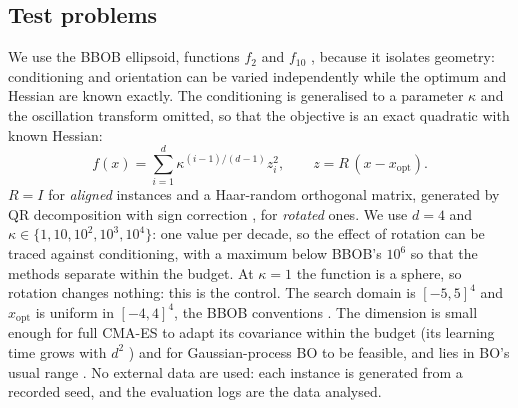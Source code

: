 \documentclass[12pt]{article}
\begin{document}
\subsection{Test problems}
We use the BBOB ellipsoid, functions $f_2$ and $f_{10}$ \parencite{hansen2009functions}, because it isolates geometry: conditioning and orientation can be varied independently while the optimum and Hessian are known exactly. The conditioning is generalised to a parameter $\kappa$ and the oscillation transform omitted, so that the objective is an exact quadratic with known Hessian:
\begin{equation}
\label{eq:ellipsoid}
f(x)=\sum_{i=1}^{d}\kappa^{(i-1)/(d-1)} z_i^{2},\qquad z=R\,(x-x_{\mathrm{opt}}).
\end{equation}
$R=I$ for \emph{aligned} instances and a Haar-random orthogonal matrix, generated by QR decomposition with sign correction \parencite{mezzadri2007random}, for \emph{rotated} ones. We use $d=4$ and $\kappa\in\{1,10,10^2,10^3,10^4\}$: one value per decade, so the effect of rotation can be traced against conditioning, with a maximum below BBOB's $10^6$ so that the methods separate within the budget. At $\kappa=1$ the function is a sphere, so rotation changes nothing: this is the control. The search domain is $[-5,5]^4$ and $x_{\mathrm{opt}}$ is uniform in $[-4,4]^4$, the BBOB conventions \parencite{hansen2009setup}. The dimension is small enough for full CMA-ES to adapt its covariance within the budget (its learning time grows with $d^2$ \parencite[p.~14]{hansen2023tutorial}) and for Gaussian-process BO to be feasible, and lies in BO's usual range \parencite{frazier2018tutorial}. No external data are used: each instance is generated from a recorded seed, and the evaluation logs are the data analysed.
\end{document}
